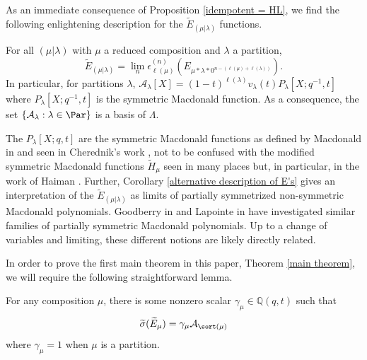As an immediate consequence of Proposition \ref{idempotent = HL}, we find the following enlightening description for the $\widetilde{E}_{(\mu|\lambda)}$ functions.

\begin{coro}\label{alternative description of E's}\label{A lambdas are basis}
    For all $(\mu|\lambda)$ with $\mu$ a reduced composition and $\lambda$ a partition,
    \begin{equation}
        \widetilde{E}_{(\mu|\lambda)} = \lim_{n} \epsilon_{\ell(\mu)}^{(n)}(E_{\mu*\lambda*0^{n-(\ell(\mu)+\ell(\lambda))}}).
    \end{equation}
    In particular, for partitions $\lambda$, $\mathcal{A}_{\lambda}[X] = (1-t)^{\ell(\lambda)} v_{\lambda}(t)P_{\lambda}[X;q^{-1},t]$ where $P_{\lambda}[X;q^{-1},t]$ is the symmetric Macdonald function. As a consequence, the set $\{ \mathcal{A}_{\lambda} : \lambda \in \Par \}$ is a basis of $\Lambda$.
\end{coro}

\begin{rema}
    The $P_{\lambda}[X;q,t]$ are the symmetric Macdonald functions as defined by Macdonald in \cite[Chapter 4, Section 4, (4.7)]{Macdonald} and seen in Cherednik's work \cite{C_2003}, not to be confused with the modified symmetric Macdonald functions $\widetilde{H}_{\mu}$ seen in many places but, in particular, in the work of Haiman \cite{HVanish}. Further, Corollary \ref{alternative description of E's} gives an interpretation of the $\widetilde{E}_{(\mu|\lambda)}$ as limits of partially symmetrized non-symmetric Macdonald polynomials. Goodberry in \cite{Goodberry} and Lapointe in \cite{lapointe2022msymmetric} have investigated similar families of partially symmetric Macdonald polynomials. Up to a change of variables and limiting, these different notions are likely directly related. 
\end{rema}

In order to prove the first main theorem in this paper, Theorem \ref{main theorem}, we will require the following straightforward lemma. 

\begin{lemm} \label{permuting and A lambdas}
For any composition $\mu$, there is some nonzero scalar $\gamma_{\mu} \in \mathbb{Q}(q,t)$ such that 
$$ \widetilde{\sigma}( \widetilde{E}_{\mu} ) = \gamma_{\mu} \mathcal{A}_{\sort(\mu)} $$
where $\gamma_{\mu} = 1$ when $\mu$ is a partition.
\end{lemm}

